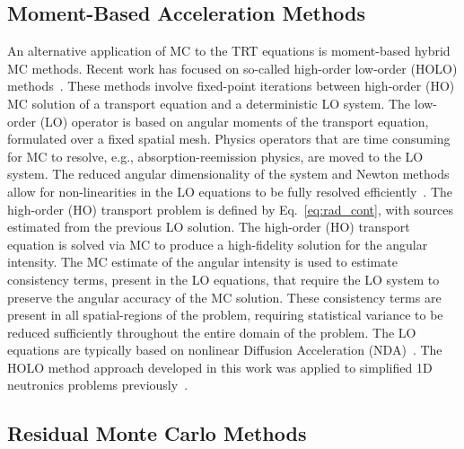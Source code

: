 \subsection{Moment-Based Acceleration Methods}

An alternative application of MC to the TRT equations is moment-based hybrid MC methods.
Recent work has focused on so-called high-order low-order (HOLO)
methods~\cite{willert,park,rmc,ans_2014,bolding_nse}. These methods involve fixed-point
iterations between high-order (HO) MC solution of a transport equation and a deterministic LO
system.  The low-order (LO)
operator is based on angular moments of the transport equation, formulated over a fixed
spatial mesh.  Physics operators that are time consuming for MC
to resolve, e.g., absorption-reemission physics, are moved to the LO
system.  The reduced angular dimensionality of the system and Newton methods allow for non-linearities in the LO equations to be fully
resolved efficiently~\cite{willert,park}.  The high-order (HO) transport problem is defined by 
Eq.~\eqref{eq:rad_cont}, with sources estimated from the previous LO solution.  
The high-order (HO) transport equation is solved via MC to produce a high-fidelity solution for
the angular intensity.  The MC estimate of the angular intensity is used to estimate
consistency terms,
present in the LO equations, that require the LO system to preserve the angular accuracy of the
MC solution.   
These consistency terms are present in all spatial-regions of the problem, requiring
statistical variance to be reduced sufficiently throughout the entire domain of the
problem.   The LO equations are typically based on nonlinear Diffusion Acceleration
(NDA)~\cite{willert,park}.  The HOLO method approach developed in this work was applied to
simplified 1D neutronics problems previously~\cite{ans_2014}.

\subsection{Residual Monte Carlo Methods}

